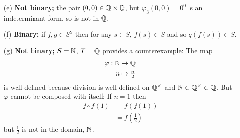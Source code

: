 \documentclass[../UNABRIDGEDalgebraNotesMSRI-UP2016.tex]{subfiles}
\begin{document}
\begin{frame}
\begin{itemize}
%	
%
%
\item[(e)] \textbf{Not binary;} the pair $(0,0)\in\mathbb Q\times \mathbb Q$, but $\varphi_3(0,0)=0^0$ is an indeterminant form, so is not in $\mathbb Q$.   

\smallGap
\item[(f)] \textbf{Binary;} if $f,g\in S^S$ then for any $s\in S$, $f(s)\in S$ and so $g\left(f(s)\right)\in S$.  

\smallGap
\item[(g)] \textbf{Not binary;} $S=\mathbb N$, $T=\mathbb Q$ provides a counterexample: The map
\begin{align*}
\varphi:\mathbb N & \to \mathbb Q \\
	n & \mapsto {\textstyle\frac{n}{2}}
\end{align*}
is well-defined because division is well-defined on $\mathbb Q^{\times}$ and $\mathbb N\subset \mathbb Q^{\times}\subset \mathbb Q$.  But $\varphi$ cannot be composed with itself: If $n=1$ then
\begin{align*}
f\circ f(1) & = f\left(f(1)\right) \\
	& = f\left({\textstyle\frac{1}{2}}\right) 
\end{align*}
but $\frac{1}{2}$ is not in the domain, $\mathbb N$.
\end{itemize}
\end{frame}
\end{document}
